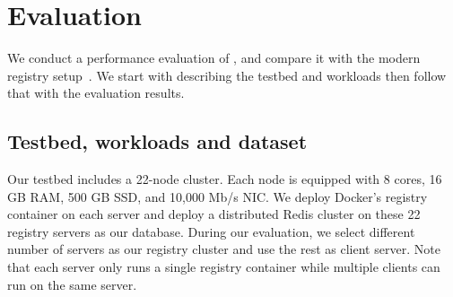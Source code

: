 \section{ Evaluation}
\label{sec:Evaluation}


We conduct a performance evaluation of \sysname, and compare it with the modern registry setup~\cite{dockerworkload}.
We start with describing the testbed and workloads then follow that with the evaluation results.
\subsection{Testbed, workloads and dataset}

Our testbed includes 
a 22-node cluster.
Each node is equipped with 8 cores, 16 GB RAM, 500 GB SSD, and 10,000 Mb/s NIC. We deploy Docker's registry container on each server and deploy a distributed Redis cluster on these 22 registry servers as our database.
During our evaluation,
we select different number of servers as our registry cluster
and use the rest as client server.
Note that each server only runs a single registry container
while multiple clients can run on the same server.

